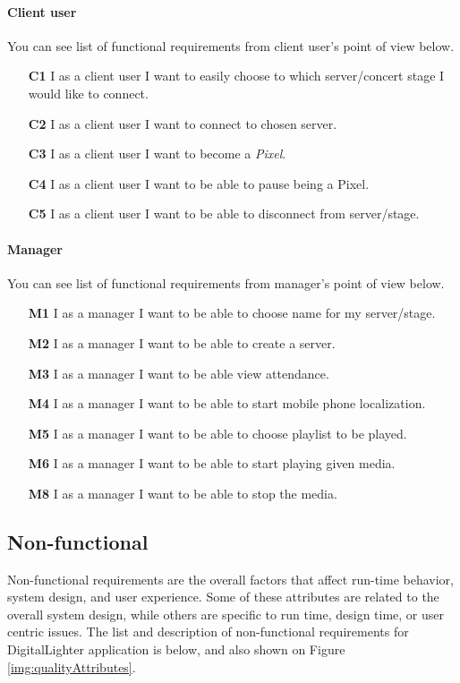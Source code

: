 \paragraph{Client user} You can see list of functional requirements from client user's point of view below.
\begin{enumerate}
	\item[\textbf{C1}] \label{req_C1}
		I as a client user I want to easily choose to which server/concert stage I would like to connect.
	\item[\textbf{C2}] \label{req_C2}
		I as a client user I want to connect to chosen server.
	\item[\textbf{C3}] \label{req_C3}
		I as a client user I want to become a \emph{Pixel}.
	\item[\textbf{C4}] \label{req_C4}
		I as a client user I want to be able to pause being a Pixel.
	\item[\textbf{C5}] \label{req_C5}
		I as a client user I want to be able to disconnect from server/stage.
\end{enumerate}


\paragraph{Manager} You can see list of functional requirements from manager's point of view below.
\begin{enumerate}
	\item[\textbf{M1}] \label{req_M1}
		I as a manager I want to be able to choose name for my server/stage.
	\item[\textbf{M2}] \label{req_M2}
		I as a manager I want to be able to create a server.
	\item[\textbf{M3}] \label{req_M3}
		I as a manager I want to be able view attendance.
	\item[\textbf{M4}] \label{req_M4}
		I as a manager I want to be able to start mobile phone localization.
	\item[\textbf{M5}] \label{req_M5}
		I as a manager I want to be able to choose playlist to be played.
	\item[\textbf{M6}] \label{req_M6}
		I as a manager I want to be able to start playing given media.
	\item[\textbf{M8}] \label{req_M7}
		I as a manager I want to be able to stop the media.
\end{enumerate}

\subsection{Non-functional}
Non-functional requirements are the overall factors that affect run-time behavior, system design, and user experience. Some of these attributes are related to the overall system design, while others are specific to run time, design time, or user centric issues. The list and description of non-functional requirements for DigitalLighter application is below, and also shown on Figure \ref{img:qualityAttributes}.

